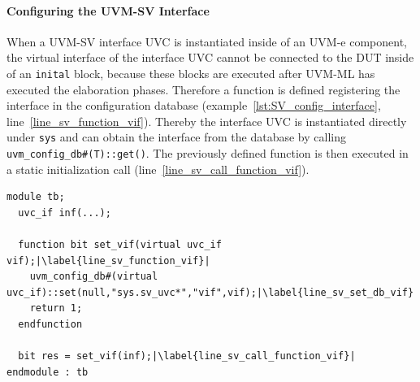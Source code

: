 \paragraph{Configuring the UVM-SV Interface}
When a UVM-SV interface UVC is instantiated inside of an UVM-e component, the virtual interface of the interface UVC cannot be connected to the DUT inside of an \lstinline$inital$ block, because these blocks are executed after UVM-ML has executed the elaboration phases. Therefore a function is defined registering the interface in the configuration database (example~\ref{lst:SV_config_interface}, line~\ref{line_sv_function_vif}). Thereby the interface UVC is instantiated directly under \lstinline$sys$ and can obtain the interface from the database by calling \lstinline$uvm_config_db#(T)::get()$. The previously defined function is then executed in a static initialization call (line~\ref{line_sv_call_function_vif}).
\lstset{language=SystemVerilog, numbers = left, escapechar=|, breaklines=true}
\begin{lstlisting}[frame=htrbl, caption={SystemVerilog: configuring the UVM-SV interface},
label={lst:SV_config_interface}]
module tb;
  uvc_if inf(...);
	
  function bit set_vif(virtual uvc_if vif);|\label{line_sv_function_vif}|
    uvm_config_db#(virtual uvc_if)::set(null,"sys.sv_uvc*","vif",vif);|\label{line_sv_set_db_vif}|
    return 1;
  endfunction

  bit res = set_vif(inf);|\label{line_sv_call_function_vif}|
endmodule : tb
\end{lstlisting}
